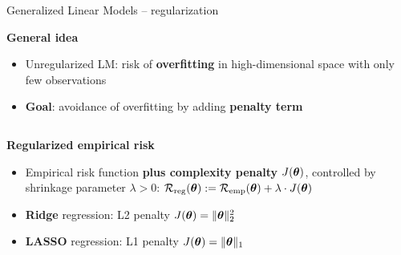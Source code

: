 \documentclass[11pt,compress,t,notes=noshow, xcolor=table]{beamer}
\newcommand{\highlight}[1]{\textcolor{hlcol}{\textbf{#1}}}
\begin{document}
\begin{vbframe}{Generalized Linear Models -- regularization}

  \highlight{General idea}

\begin{itemize}
  \item Unregularized LM: risk of \textbf{overfitting} in high-dimensional 
  space with only few observations
  \item \textbf{Goal}: avoidance of overfitting by adding \textbf{penalty term}
\end{itemize}





\medskip
\begin{columns}[T, totalwidth=\textwidth]
    \begin{column}{0.55\textwidth}
        
\highlight{Regularized empirical risk}

\begin{itemize}
  \item Empirical risk function \textbf{plus complexity penalty} 
  $J(\bm{\theta})$, controlled by shrinkage parameter $\lambda > 0$:
  $\mathcal{R}_{\text{reg}}(\bm{\theta}) := \mathcal{R}_{\text{emp}}(\bm{\theta}) + \lambda \cdot J(\bm{\theta})$
    \item \textbf{Ridge} regression: L2 penalty $J(\bm{\theta}) = \|\bm{\theta}\|_2^2 $
    \item \textbf{LASSO} regression: L1 penalty $J(\bm{\theta}) = \|\bm{\theta}\|_1 $

\end{itemize}

\end{column}

\end{columns}


\end{vbframe}
\end{document}
